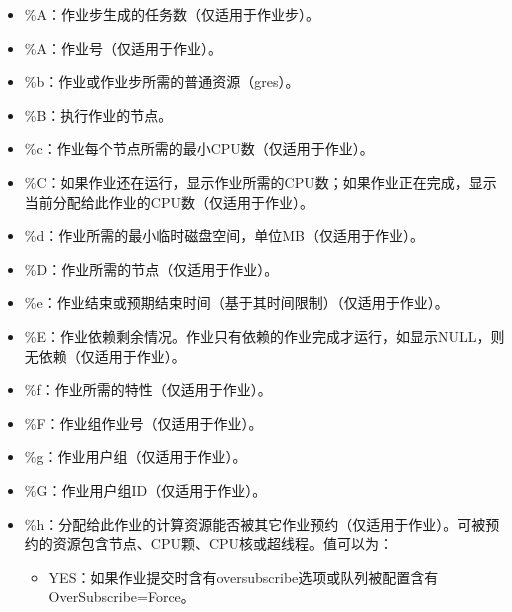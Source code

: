 \documentclass[a4paper,12pt,english]{sphinxmanual}
\begin{document}
\begin{itemize}
\begin{itemize}
\begin{itemize}
\item {} 
\sphinxAtStartPar
\%A：作业步生成的任务数（仅适用于作业步）。

\item {} 
\sphinxAtStartPar
\%A：作业号（仅适用于作业）。

\item {} 
\sphinxAtStartPar
\%b：作业或作业步所需的普通资源（gres）。

\item {} 
\sphinxAtStartPar
\%B：执行作业的节点。

\item {} 
\sphinxAtStartPar
\%c：作业每个节点所需的最小CPU数（仅适用于作业）。

\item {} 
\sphinxAtStartPar
\%C：如果作业还在运行，显示作业所需的CPU数；如果作业正在完成，显示当前分配给此作业的CPU数（仅适用于作业）。

\item {} 
\sphinxAtStartPar
\%d：作业所需的最小临时磁盘空间，单位MB（仅适用于作业）。

\item {} 
\sphinxAtStartPar
\%D：作业所需的节点（仅适用于作业）。

\item {} 
\sphinxAtStartPar
\%e：作业结束或预期结束时间（基于其时间限制）（仅适用于作业）。

\item {} 
\sphinxAtStartPar
\%E：作业依赖剩余情况。作业只有依赖的作业完成才运行，如显示NULL，则无依赖（仅适用于作业）。

\item {} 
\sphinxAtStartPar
\%f：作业所需的特性（仅适用于作业）。

\item {} 
\sphinxAtStartPar
\%F：作业组作业号（仅适用于作业）。

\item {} 
\sphinxAtStartPar
\%g：作业用户组（仅适用于作业）。

\item {} 
\sphinxAtStartPar
\%G：作业用户组ID（仅适用于作业）。

\item {} 
\sphinxAtStartPar
\%h：分配给此作业的计算资源能否被其它作业预约（仅适用于作业）。可被预约的资源包含节点、CPU颗、CPU核或超线程。值可以为：
\begin{itemize}
\item {} 
\sphinxAtStartPar
YES：如果作业提交时含有oversubscribe选项或队列被配置含有OverSubscribe=Force。


\end{itemize}
\end{itemize}
\end{itemize}
\end{itemize}
\end{document}
